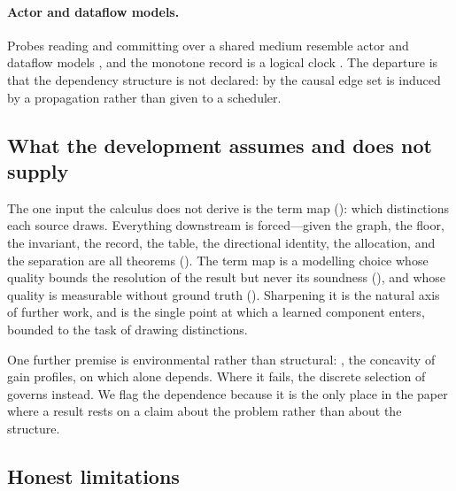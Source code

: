 \documentclass[11pt,twocolumn,a4paper]{article}
\theoremstyle{dirthm}
\theoremstyle{definition}
\theoremstyle{remark}
\begin{document}
\paragraph{Actor and dataflow models.}
Probes reading and committing over a shared medium resemble actor and dataflow
models \citep{hewitt1973,kahn1974,lee1995}, and the monotone record is a
logical clock \citep{lamport1978}. The departure is that the dependency
structure is not declared: by  the causal edge set is
induced by a propagation rather than given to a scheduler.

\subsection{What the development assumes and does not supply}

The one input the calculus does not derive is the term map
(): which distinctions each source draws. Everything
downstream is forced---given the graph, the floor, the invariant, the record,
the table, the directional identity, the allocation, and the separation are
all theorems (). The term map is a modelling choice
whose quality bounds the resolution of the result but never its soundness
(), and whose quality is measurable without ground truth
(). Sharpening it is the natural axis of further
work, and is the single point at which a learned component enters, bounded to
the task of drawing distinctions.

One further premise is environmental rather than structural:
, the concavity of gain profiles, on which
 alone depends. Where it fails, the discrete selection of
 governs instead. We flag the dependence because it is the
only place in the paper where a result rests on a claim about the problem
rather than about the structure.

\subsection{Honest limitations}
\end{document}
